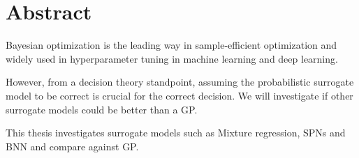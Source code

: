 \section*{Abstract}
Bayesian optimization is the leading way in sample-efficient optimization and
widely used in hyperparameter tuning in machine learning and deep learning. 

However, from a decision theory standpoint, assuming the probabilistic surrogate model to be correct
is crucial for the correct decision. We will investigate if other surrogate models could be better
than a GP. 

This thesis investigates surrogate models such as 
Mixture regression, SPNs and BNN and compare against GP. 







